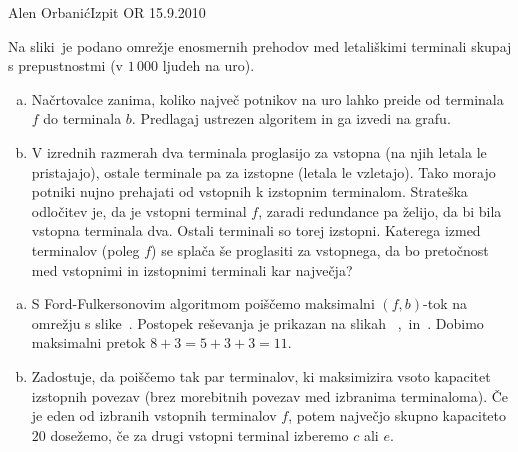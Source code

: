 \begin{naloga}{Alen Orbanić}{Izpit OR 15.9.2010}
\begin{vprasanje}
Na sliki~\fig je podano omrežje enosmernih prehodov
med letališkimi terminali skupaj s prepustnostmi (v $1\,000$ ljudeh na uro).

\begin{enumerate}[(a)]
\item Načrtovalce zanima,
koliko največ potnikov na uro lahko preide od terminala $f$ do terminala $b$.
Predlagaj ustrezen algoritem in ga izvedi na grafu.

\item V izrednih razmerah dva terminala proglasijo za vstopna
(na njih letala le pristajajo),
ostale terminale pa za izstopne (letala le vzletajo).
Tako morajo potniki nujno prehajati od vstopnih k izstopnim terminalom.
Strateška odločitev je, da je vstopni terminal $f$,
zaradi redundance pa želijo, da bi bila vstopna terminala dva.
Ostali terminali so torej izstopni.
Katerega izmed terminalov (poleg $f$) se splača še proglasiti za vstopnega,
da bo pretočnost med vstopnimi in izstopnimi terminali kar največja?
\end{enumerate}

\begin{slika}
\pgfslika
{}
\end{slika}
\end{vprasanje}

\begin{odgovor}
\begin{enumerate}[(a)]
\item S Ford-Fulkersonovim algoritmom poiščemo maksimalni $(f, b)$-tok
na omrež\-ju s slike~\fig.
Postopek reševanja je prikazan na slikah~%
,~ in~.
Dobimo maksimalni pretok $8+3 = 5+3+3 = 11$.

\item Zadostuje, da poiščemo tak par terminalov,
ki maksimizira vsoto kapacitet izstopnih povezav
(brez morebitnih povezav med izbranima terminaloma).
Če je eden od izbranih vstopnih terminalov $f$,
potem največjo skupno kapaciteto $20$ dosežemo,
če za drugi vstopni terminal izberemo $c$ ali $e$.
\end{enumerate}

\begin{slika}
\end{slika}
\begin{slika}
\end{slika}
\begin{slika}
\end{slika}
\end{odgovor}
\end{naloga}
